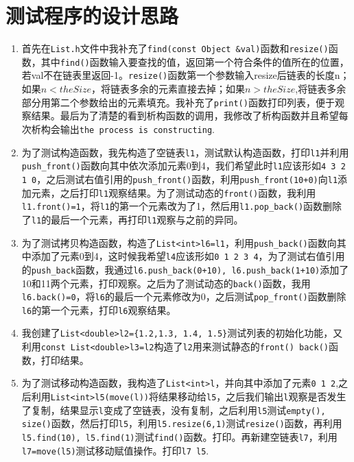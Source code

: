 \documentclass[UTF8]{ctexart}
\begin{document}
\pagestyle{fancy}
\fancyhead{}
\rhead{\today}

\section{测试程序的设计思路}
\begin{enumerate}
	\item 首先在\lstinline|List.h|文件中我补充了\lstinline|find(const Object &val)|函数和\lstinline|resize()|函数，其中\lstinline|find()|函数输入要查找的值，返回第一个符合条件的值所在的位置，若val不在链表里返回-1。\lstinline|resize()|函数第一个参数输入resize后链表的长度n；如果$n<theSize$，将链表多余的元素直接去掉；如果$n>theSize$,将链表多余部分用第二个参数给出的元素填充。我补充了\lstinline|print()|函数打印列表，便于观察结果。最后为了清楚的看到析构函数的调用，我修改了析构函数并且希望每次析构会输出\lstinline|the process is constructing|.
	\item 为了测试构造函数，我先构造了空链表\lstinline|l1|，测试默认构造函数，打印\lstinline|l1|并利用\lstinline|push_front()|函数向其中依次添加元素0到4，我们希望此时\lstinline|l1|应该形如\lstinline|4 3 2 1 0|，之后测试右值引用的\lstinline|push_front()|函数，利用\lstinline|push_front(10+0)|向\lstinline|l1|添加元素，之后打印\lstinline|l1|观察结果。为了测试动态的\lstinline|front()|函数，我利用\lstinline|l1.front()=1|，将\lstinline|l1|的第一个元素改为了1，然后用\lstinline|l1.pop_back()|函数删除了\lstinline|l1|的最后一个元素，再打印\lstinline|l1|观察与之前的异同。
	\item 为了测试拷贝构造函数，构造了\lstinline|List<int>l6=l1|，利用\lstinline|push_back()|函数向其中添加了元素0到4，这时候我希望\lstinline|l4|应该形如\lstinline|0 1 2 3 4|，为了测试右值引用的\lstinline|push_back|函数，我通过\lstinline|l6.push_back(0+10), l6.push_back(1+10)|添加了10和11两个元素，打印观察。之后为了测试动态的\lstinline|back()|函数，我用\lstinline|l6.back()=0|，将\lstinline|l6|的最后一个元素修改为0，之后测试\lstinline|pop_front()|函数删除\lstinline|l6|的第一个元素，打印\lstinline|l6|观察结果。
	\item  我创建了\lstinline|List<double>l2={1.2,1.3, 1.4, 1.5}|测试列表的初始化功能，又利用\lstinline|const List<double>l3=l2|构造了\lstinline|l2|用来测试静态的\lstinline|front() back()|函数，打印结果。
	\item  为了测试移动构造函数，我构造了\lstinline|List<int>l|，并向其中添加了元素\lstinline|0 1 2|,之后利用\lstinline|List<int>l5(move(l))|将结果移动给\lstinline|l5|，之后我们输出\lstinline|l|观察是否发生了复制，结果显示\lstinline|l|变成了空链表，没有复制，之后利用\lstinline|l5|测试\lstinline|empty(), size()|函数，然后打印\lstinline|l5|，利用\lstinline|l5.resize(6,1)|测试\lstinline|resize()|函数，再利用\lstinline|l5.find(10), l5.find(1)|测试\lstinline|find()|函数。打印。再新建空链表\lstinline|l7|，利用\lstinline|l7=move(l5)|测试移动赋值操作。打印\lstinline|l7 l5|.

\end{enumerate}
\end{document}
